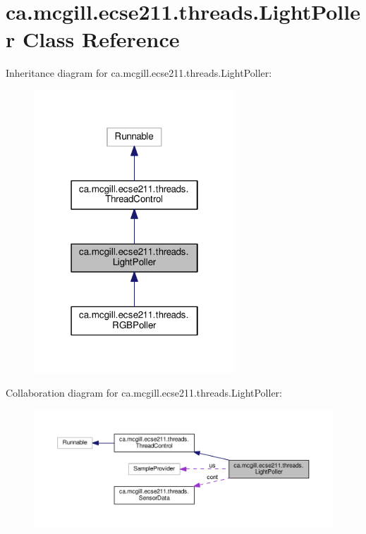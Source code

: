 \hypertarget{classca_1_1mcgill_1_1ecse211_1_1threads_1_1_light_poller}{}\section{ca.\+mcgill.\+ecse211.\+threads.\+Light\+Poller Class Reference}
\label{classca_1_1mcgill_1_1ecse211_1_1threads_1_1_light_poller}


Inheritance diagram for ca.\+mcgill.\+ecse211.\+threads.\+Light\+Poller\+:\nopagebreak
\begin{figure}[H]
\begin{center}
\leavevmode
\includegraphics[width=214pt]{classca_1_1mcgill_1_1ecse211_1_1threads_1_1_light_poller__inherit__graph}
\end{center}
\end{figure}


Collaboration diagram for ca.\+mcgill.\+ecse211.\+threads.\+Light\+Poller\+:\nopagebreak
\begin{figure}[H]
\begin{center}
\leavevmode
\includegraphics[width=350pt]{classca_1_1mcgill_1_1ecse211_1_1threads_1_1_light_poller__coll__graph}
\end{center}
\end{figure}
